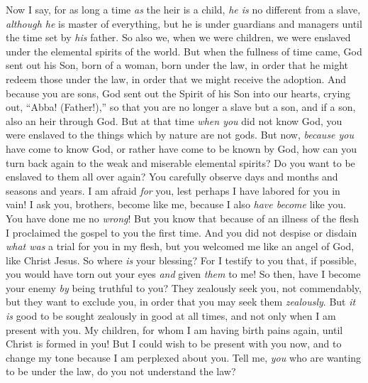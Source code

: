 \begin{biblechapter} %
 Now I say, for as long a time \textit{as} the heir is a child, \textit{he is} no different from a slave, \textit{although he} is master of everything,
\verse but he is under guardians and managers until the time set by \textit{his} father.
\verse So also we, when we were children, we were enslaved under the elemental spirits of the world.
\verse But when the fullness of time came, God sent out his Son, born of a woman, born under the law,
\verse in order that he might redeem those under the law, in order that we might receive the adoption.
\verse And because you are sons, God sent out the Spirit of his Son into our hearts, crying out, “Abba! (Father!),”
\verse so that you are no longer a slave but a son, and if a son, also an heir through God.
 But at that time \textit{when you} did not know God, you were enslaved to the things which by nature are not gods.
\verse But now, \textit{because you} have come to know God, or rather have come to be known by God, how can you turn back again to the weak and miserable elemental spirits? Do you want to be enslaved to them all over again?
\verse You carefully observe days and months and seasons and years.
\verse I am afraid \textit{for} you, lest perhaps I have labored for you in vain!
\verse I ask you, brothers, become like me, because I also \textit{have become} like you. You have done me no \textit{wrong}!
 But you know that because of an illness of the flesh I proclaimed the gospel to you the first time.
\verse And you did not despise or disdain \textit{what was} a trial for you in my flesh, but you welcomed me like an angel of God, like Christ Jesus.
\verse So where \textit{is} your blessing? For I testify to you that, if possible, you would have torn out your eyes \textit{and} given \textit{them} to me!
\verse So then, have I become your enemy \textit{by} being truthful to you?
\verse They zealously seek you, not commendably, but they want to exclude you, in order that you may seek them \textit{zealously}.
\verse But \textit{it is} good to be sought zealously in good at all times, and not only when I am present with you.
\verse My children, for whom I am having birth pains again, until Christ is formed in you!
\verse But I could wish to be present with you now, and to change my tone because I am perplexed about you.
 Tell me, \textit{you} who are wanting to be under the law, do you not understand the law?

\end{biblechapter}
